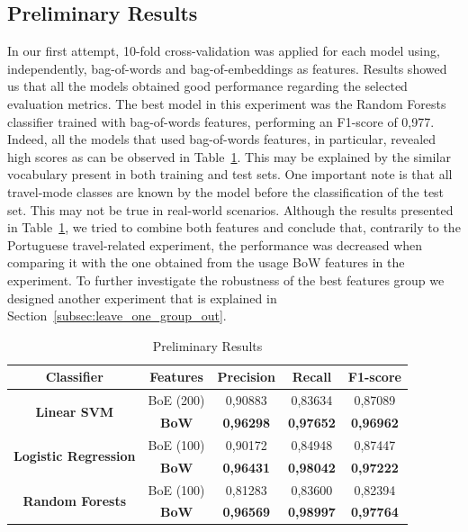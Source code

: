 \subsection{Preliminary Results}\label{subsec:preliminar_results}
In our first attempt, 10-fold cross-validation was applied for each model using, independently, bag-of-words and bag-of-embeddings as features. Results
showed us that all the models obtained good performance regarding the selected evaluation metrics. The best model in this experiment was the Random Forests classifier trained with bag-of-words features, performing an F1-score of 0,977. Indeed, all the models that used bag-of-words features, in particular, revealed high scores as can be observed in Table~\ref{tab:first_experiment}. This may be explained by the similar vocabulary present in both training and test sets. One important note is that all travel-mode classes are known by the model before the classification of the test set. This may not be true in real-world scenarios. Although the results presented in Table~\ref{tab:first_experiment}, we tried to combine both features and conclude that, contrarily to the Portuguese travel-related experiment, the performance was decreased when comparing it with the one obtained from the usage BoW features in the experiment. To further investigate the robustness of the best features group we designed another experiment that is explained in Section~\ref{subsec:leave_one_group_out}.

\begin{table}[htbp]
	\small
	\centering
	\caption{Preliminary Results}
	\label{tab:first_experiment}
	\begin{tabular}{|c|c|c|c|c|}
		\hline
		\textbf{Classifier} & \textbf{Features} & \textbf{Precision} & \textbf{Recall}  & \textbf{F1-score} \\ \hline
		\multirow{2}{*}{\textbf{Linear SVM}} & BoE (200) & 0,90883   & 0,83634 & 0,87089  \\
		& \textbf{BoW} & \textbf{0,96298}   & \textbf{0,97652} & \textbf{0,96962}  \\ \hline
		\multirow{2}{*}{\textbf{Logistic Regression}} & BoE (100) & 0,90172   & 0,84948 & 0,87447  \\
		& \textbf{BoW} & \textbf{0,96431}   & \textbf{0,98042} & \textbf{0,97222}  \\ \hline
		\multirow{2}{*}{\textbf{Random Forests}} & BoE (100) & 0,81283   & 0,83600 & 0,82394  \\
		& \textbf{BoW} & \textbf{0,96569}   & \textbf{0,98997} & \textbf{0,97764}  \\ \hline
	\end{tabular}
\end{table}

